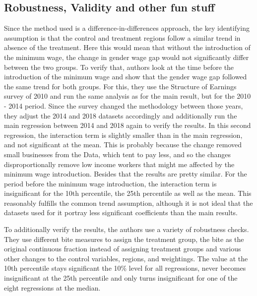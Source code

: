 \documentclass[12pt,draft,a4paper]{article}
\begin{document}
\subsection{Robustness, Validity and other fun stuff}


Since the method used is a difference-in-differences approach, the key identifying assumption is that the control and treatment regions follow a similar trend in absence of the treatment.
Here this would mean that without the introduction of the minimum wage,
the change in gender wage gap would not significantly differ between the two groups.
To verify that, authors look at the time before the introduction of the minimum wage and
show that the gender wage gap followed the same trend for both groups.
For this, they use the Structure of Earnings survey of 2010 and run the same analysis as for the main result,
but for the 2010 - 2014 period. Since the survey changed the methodology between those years, they adjust the 2014 and 2018 datasets accordingly and additionally run the main regression between 2014 and 2018 again to verify the results.
In this second regression, the interaction term is slightly smaller than in the main regression,
and not significant at the mean. This is probably because the change removed small businesses from the Data, which tent to pay less, and so the changes disproportionally remove low income workers that might me affected by the minimum wage introduction. Besides that the results are pretty similar.
For the period before the minimum wage introduction, the interaction term is insignificant for the 10th percentile, the 25th percentile as well as the mean. This reasonably fulfills the common trend assumption,
although it is not ideal that the datasets used for it portray less significant coefficients than the main results.

To additionally verify the results, the authors use a variety of robustness checks. 
They use different bite measures to assign the treatment group, the bite as the original continuous fraction instead of assigning treatment groups and various other changes to the control variables, regions, and weightings.
The value at the 10th percentile stays significant the 10\% level for all regressions, never becomes insignificant at the 25th percentile and only turns insignificant for one of the eight regressions at the median. 
\end{document}
